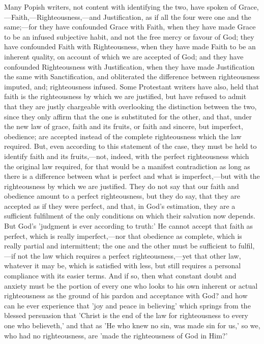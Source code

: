 \documentclass[
]{book}
\begin{document}
Many Popish writers, not content with identifying the two, have spoken of Grace,---Faith,---Righteousness,---and Justification, as if all the four were one and the same;---for they have confounded Grace with Faith, when they have made Grace to be an infused subjective habit, and not the free mercy or favour of God; they have confounded Faith with Righteousness, when they have made Faith to be an inherent quality, on account of which we are accepted of God; and they have confounded Righteousness with Justification, when they have made Justification the same with Sanctification, and obliterated the difference between righteousness imputed, and; righteousness infused. Some Protestant writers have also, held that faith is the righteousness by which we are justified, but have refused to admit that they are justly chargeable with overlooking the distinction between the two, since they only affirm that the one is substituted for the other, and that, under the new law of grace, faith and its fruits, or faith and sincere, but imperfect, obedience; are accepted instead of the complete righteousness which the law required. But, even according to this statement of the case, they must be held to identify faith and its fruits,---not, indeed, with the perfect righteousness which the original law required, for that would be a manifest contradiction as long as there is a difference between what is perfect and what is imperfect,---but with the righteousness by which we are justified. They do not say that our faith and obedience amount to a perfect righteousness, but they do say, that they are accepted as if they were perfect, and that, in God's estimation, they are a sufficient fulfilment of the only conditions on which their salvation now depends. But God's 'judgment is ever according to truth:' He cannot accept that faith as perfect, which is really imperfect,---nor that obedience as complete, which is really partial and intermittent; the one and the other must be sufficient to fulfil,---if not the law which requires a perfect righteousness,---yet that other law, whatever it may be, which is satisfied with less, but still requires a personal compliance with its easier terms. And if so, then what constant doubt and anxiety must be the portion of every one who looks to his own inherent or actual righteousness as the ground of his pardon and acceptance with God? and how can he ever experience that 'joy and peace in believing' which springs from the blessed persuasion that 'Christ is the end of the law for righteousness to every one who believeth,' and that as 'He who knew no sin, was made sin for us,' so we, who had no righteousness, are 'made the righteousness of God in Him?'
\end{document}
